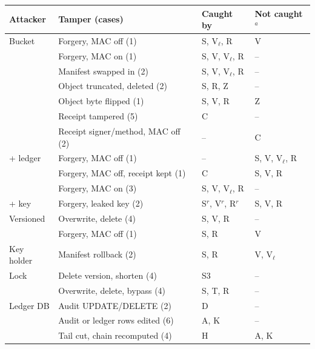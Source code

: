 
\begin{tabular}{@{}llll@{}}
\toprule
Attacker & Tamper (cases) & Caught by & Not caught$^a$ \\
\midrule
Bucket & Forgery, MAC off (1) & S, V$_\ell$, R & V \\
 & Forgery, MAC on (1) & S, V, V$_\ell$, R & -- \\
 & Manifest swapped in (2) & S, V, V$_\ell$, R & -- \\
 & Object truncated, deleted (2) & S, R, Z & -- \\
 & Object byte flipped (1) & S, V, R & Z \\
 & Receipt tampered (5) & C & -- \\
 & Receipt signer/method, MAC off (2) & -- & C \\
\addlinespace[1pt]
+ ledger & Forgery, MAC off (1) & -- & S, V, V$_\ell$, R \\
 & Forgery, MAC off, receipt kept (1) & C & S, V, R \\
 & Forgery, MAC on (3) & S, V, V$_\ell$, R & -- \\
\addlinespace[1pt]
+ key & Forgery, leaked key (2) & S$^r$, V$^r$, R$^r$ & S, V, R \\
\addlinespace[1pt]
Versioned & Overwrite, delete (4) & S, V, R & -- \\
 & Forgery, MAC off (1) & S, R & V \\
\addlinespace[1pt]
Key holder & Manifest rollback (2) & S, R & V, V$_\ell$ \\
\addlinespace[1pt]
Lock & Delete version, shorten (4) & S3 & -- \\
 & Overwrite, delete, bypass (4) & S, T, R & -- \\
\addlinespace[1pt]
Ledger DB & Audit UPDATE/DELETE (2) & D & -- \\
 & Audit or ledger rows edited (6) & A, K & -- \\
 & Tail cut, chain recomputed (4) & H & A, K \\
\bottomrule
\end{tabular}
